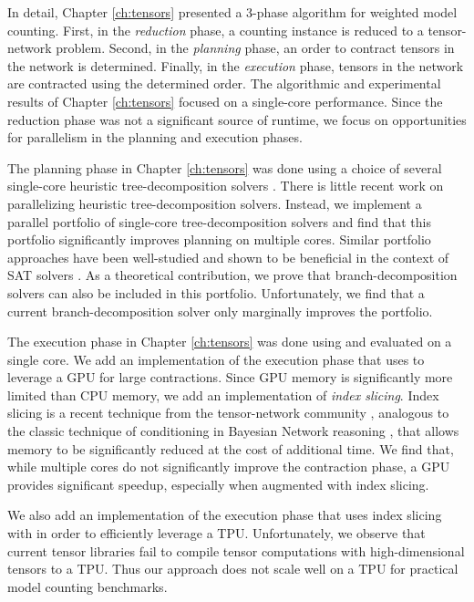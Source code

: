 In detail, Chapter \ref{ch:tensors} presented a 3-phase algorithm for weighted model counting. First, in the \emph{reduction} phase, a counting instance is reduced to a tensor-network problem. Second, in the \emph{planning} phase, an order to contract tensors in the network is determined. Finally, in the \emph{execution} phase, tensors in the network are contracted using the determined order. The algorithmic and experimental results of Chapter \ref{ch:tensors} focused on a single-core performance.  Since the reduction phase was not a significant source of runtime, we focus on opportunities for parallelism in the planning and execution phases.

The planning phase in Chapter \ref{ch:tensors} was done using a choice of several single-core heuristic tree-decomposition solvers \cite{AMW17,HS18,Tamaki17}. There is little recent work on parallelizing heuristic tree-decomposition solvers. Instead, we implement a parallel portfolio of single-core tree-decomposition solvers and find that this portfolio significantly improves planning on multiple cores. Similar portfolio approaches have been well-studied and shown to be beneficial in the context of SAT solvers \cite{BSS15,XHHL08}. As a theoretical contribution, we prove that branch-decomposition solvers can also be included in this portfolio. Unfortunately, we find that a current branch-decomposition solver only marginally improves the portfolio.

The execution phase in Chapter \ref{ch:tensors} was done using  \cite{numpy} and evaluated on a single core. We add an implementation of the execution phase that uses  \cite{ABCCDDDGII16} to leverage a GPU for large contractions. Since GPU memory is significantly more limited than CPU memory, we add an implementation of \emph{index slicing}. Index slicing is a recent technique from the tensor-network community \cite{CZHNS18,GK20,VBNHRBM19}, analogous to the classic technique of conditioning in Bayesian Network reasoning \cite{darwiche01,dechter99,pearl86,SAS94}, that allows memory to be significantly reduced at the cost of additional time. We find that, while multiple cores do not significantly improve the contraction phase, a GPU provides significant speedup, especially when augmented with index slicing. 

We also add an implementation of the execution phase that uses index slicing with  \cite{jax2018github} in order to efficiently leverage a TPU. 
Unfortunately, we observe that current tensor libraries fail to compile tensor computations with high-dimensional tensors to a TPU.
Thus our approach does not scale well on a TPU for practical model counting benchmarks.

